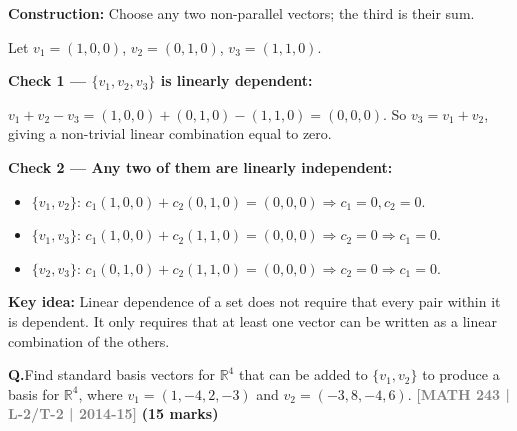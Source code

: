\documentclass[12pt,a3paper]{article}
\newcommand{\yr}[1]{\hfill\textcolor{gray}{\small\textbf{[#1]}}}
\newcommand{\mk}[1]{\textcolor{orange!70!black}{\small\textbf{(#1 marks)}}}
\newcounter{qnum}
\newcommand{\Q}[1]{%
  \needspace{4\baselineskip}
  \refstepcounter{qnum}
  \vspace{6pt}
  \noindent\textbf{Q\theqnum.}\enspace #1\par
}
\begin{document}
\begin{tcolorbox}[enhanced,breakable,colback=cC!4,colframe=cC,
  boxrule=0.8pt,arc=5pt,
  title={\textbf{Answer}},
  fonttitle=\bfseries\color{white},colbacktitle=cC]

\textbf{Construction:} Choose any two non-parallel vectors; the third is their sum.

Let $v_1=(1,0,0)$, $v_2=(0,1,0)$, $v_3=(1,1,0)$.

\medskip
\textbf{Check 1 --- $\{v_1,v_2,v_3\}$ is linearly dependent:}

$v_1+v_2-v_3=(1,0,0)+(0,1,0)-(1,1,0)=(0,0,0)$. So $v_3=v_1+v_2$, giving a non-trivial linear combination equal to zero. \checkmark

\medskip
\textbf{Check 2 --- Any two of them are linearly independent:}

\begin{itemize}[itemsep=2pt]
  \item $\{v_1,v_2\}$: $c_1(1,0,0)+c_2(0,1,0)=(0,0,0)\Rightarrow c_1=0,c_2=0$. \checkmark
  \item $\{v_1,v_3\}$: $c_1(1,0,0)+c_2(1,1,0)=(0,0,0)\Rightarrow c_2=0\Rightarrow c_1=0$. \checkmark
  \item $\{v_2,v_3\}$: $c_1(0,1,0)+c_2(1,1,0)=(0,0,0)\Rightarrow c_2=0\Rightarrow c_1=0$. \checkmark
\end{itemize}

\textbf{Key idea:} Linear dependence of a set does not require that every pair within it is dependent. It only requires that at least one vector can be written as a linear combination of the others.
\end{tcolorbox}

\Q{Find standard basis vectors for $\mathbb{R}^4$ that can be added to $\{v_1, v_2\}$ to produce a basis for $\mathbb{R}^4$, where $v_1 = (1,-4,2,-3)$ and $v_2 = (-3,8,-4,6)$.
\yr{MATH 243 | L-2/T-2 | 2014-15} \mk{15}}
\end{document}
